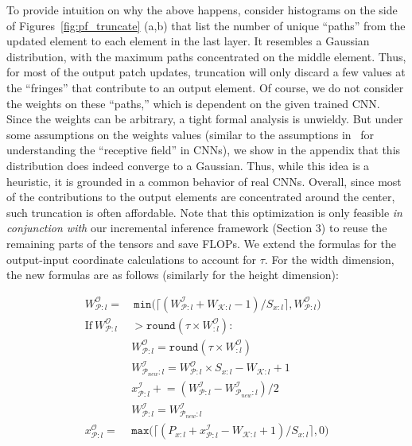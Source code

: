 To provide intuition on why the above happens, consider histograms on the side of Figures~\ref{fig:pf_truncate} (a,b) that list the number of unique ``paths'' from the updated element to each element in the last layer. It resembles a Gaussian distribution, with the maximum paths concentrated on the middle element. Thus, for most of the output patch updates, truncation will only discard a few values at the ``fringes'' that contribute to an output element. Of course, we do not consider the weights on these ``paths,'' which is dependent on the given trained CNN. Since the weights can be arbitrary, a tight formal analysis is unwieldy. But under some assumptions on the weights values (similar to the assumptions in~\cite{luo2016understanding} for understanding the ``receptive field'' in CNNs), we show in the appendix that this distribution does indeed converge to a Gaussian. Thus, while this idea is a heuristic, it is grounded in a common behavior of real CNNs.
Overall, since most of the contributions to the output elements are concentrated around the center, such truncation is often affordable. Note that this optimization is only feasible \textit{in conjunction with} our incremental inference framework (Section 3) to reuse the remaining parts of the tensors and save FLOPs.
We extend the formulas for the output-input coordinate calculations to account for $\tau$. For the width dimension,  the new formulas are as follows (similarly for the height dimension):

\vspace{-5mm}
\begin{align}
\label{eqn:normal_width_calc}
W^\mathcal{O}_{\mathcal{P}:l} = &~ \texttt{min}\big(\lceil (W^\mathcal{I}_{\mathcal{P}:l} + W_{\mathcal{K}:l} - 1)/S_{x:l} \rceil, W^\mathcal{O}_{\mathcal{P}:l}\big)\\
\label{eqn:check_tau}
\text{If}~ W_{\mathcal{P}:l}^\mathcal{O} & > \texttt{round}(\tau \times W^\mathcal{O}_{:l}):\\
\label{eqn:new_width_calc_with_tau}
& W^\mathcal{O}_{\mathcal{P}:l} = \texttt{round}(\tau \times W^\mathcal{O}_{:l})\\
\label{eqn:new_in_width}
& W^\mathcal{I}_{\mathcal{P}_{new}:l} = W^\mathcal{O}_{\mathcal{P}:l} \times S_{x:l} - W_{\mathcal{K}:l} + 1\\
\label{eqn:new_x_coord}
& x^{\mathcal{I}}_{\mathcal{P}:l} \mathrel{+}= (W^\mathcal{I}_{\mathcal{P}:l} - W^\mathcal{I}_{\mathcal{P}_{new}:l})/2\\
\label{eqn:new_input_width}
& W^\mathcal{I}_{\mathcal{P}:l} = W^\mathcal{I}_{\mathcal{P}_{new}:l}\\
\label{eqn:new_output_x}
x^\mathcal{O}_{\mathcal{P}:l} = & \texttt{max}\big(\lceil (P_{x:l} + x^\mathcal{I}_{\mathcal{P}:l} - W_{\mathcal{K}:l} + 1)/S_{x:l} \rceil, 0\big)
\end{align}


